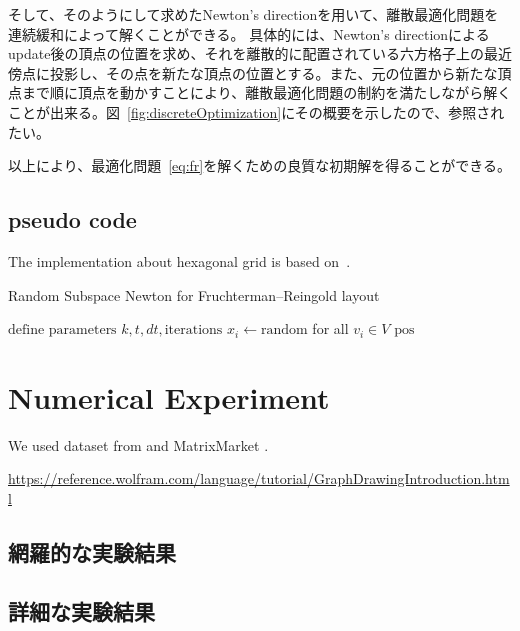 \documentclass[dvipdfmx,journal]{IEEEtran}
\begin{document}
そして、そのようにして求めたNewton's directionを用いて、離散最適化問題を連続緩和によって解くことができる。
具体的には、Newton's directionによるupdate後の頂点の位置を求め、それを離散的に配置されている六方格子上の最近傍点に投影し、その点を新たな頂点の位置とする。また、元の位置から新たな頂点まで順に頂点を動かすことにより、離散最適化問題の制約を満たしながら解くことが出来る。図~\ref{fig:discreteOptimization}にその概要を示したので、参照されたい。

以上により、最適化問題~\eqref{eq:fr}を解くための良質な初期解を得ることができる。

\subsection{pseudo code}\label{ssec:pseudoCode}

The implementation about hexagonal grid is based on~\cite{patelHexagonalGrids2013}.

\begin{algorithm}[ht]
  \caption{Random Subspace Newton for Fruchterman--Reingold layout}
  \label{alg:rsn}

  $\text{define parameters } k, t, dt, \text{iterations}$\;
  $x_i \gets \text{random}$ for all $v_i \in V$\;
  \Return $\text{pos}$
\end{algorithm}

\section{Numerical Experiment} \label{sec:experiment}

We used dataset from \cite{davis2011university} and MatrixMarket \cite{boisvertMatrixMarketWeb1997}.

\url{https://reference.wolfram.com/language/tutorial/GraphDrawingIntroduction.html}

\subsection{網羅的な実験結果}\label{ssec:exprAll}
\subsection{詳細な実験結果}\label{ssec:exprDetail}
\end{document}
